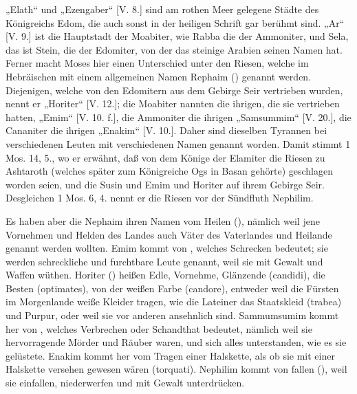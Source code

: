 „Elath“ und „Ezengaber“ [V. 8.] sind am rothen Meer gelegene Städte des Königreichs Edom, die auch sonst in der heiligen Schrift gar berühmt sind. „Ar“ [V. 9.] ist die Hauptstadt der Moabiter, wie Rabba die der Ammoniter, und Sela, das ist Stein, die der Edomiter, von der das steinige Arabien seinen Namen hat. Ferner macht Moses hier einen Unterschied unter den Riesen, welche im Hebräischen mit einem allgemeinen Namen Rephaim () genannt werden. Diejenigen, welche von den Edomitern aus dem Gebirge Seir vertrieben wurden, nennt er „Horiter“ [V. 12.]; die Moabiter nannten die ihrigen, die sie vertrieben hatten, „Emim“ [V. 10. f.], die Ammoniter die ihrigen „Samsummim“ [V. 20.], die Cananiter die ihrigen „Enakim“ [V. 10.]. Daher sind dieselben Tyrannen bei verschiedenen Leuten mit verschiedenen Namen genannt worden. Damit stimmt 1 Mos. 14, 5., wo er erwähnt, daß von dem Könige der Elamiter die Riesen zu Ashtaroth (welches später zum Königreiche Ogs in Basan gehörte) geschlagen worden seien, und die Susin und Emim und Horiter auf ihrem Gebirge Seir. Desgleichen 1 Mos. 6, 4. nennt er die Riesen vor der Sündfluth Nephilim.

Es haben aber die Nephaim ihren Namen vom Heilen (), nämlich weil jene Vornehmen und Helden des Landes auch Väter des Vaterlandes und Heilande genannt werden wollten. Emim kommt von , welches Schrecken bedeutet; sie werden schreckliche und furchtbare Leute genannt, weil sie mit Gewalt und Waffen wüthen. Horiter () heißen Edle, Vornehme, Glänzende (candidi), die Besten (optimates), von der weißen Farbe (candore), entweder weil die Fürsten im Morgenlande weiße Kleider tragen, wie die Lateiner das Staatskleid (trabea) und Purpur, oder weil sie vor anderen ansehnlich sind. Sammumsumim kommt her von , welches Verbrechen oder Schandthat bedeutet, nämlich weil sie hervorragende Mörder und Räuber waren, und sich alles unterstanden, wie es sie gelüstete. Enakim kommt her vom Tragen einer Halskette, als ob sie mit einer Halskette versehen gewesen wären (torquati). Nephilim kommt von fallen (), weil sie einfallen, niederwerfen und mit Gewalt unterdrücken.


